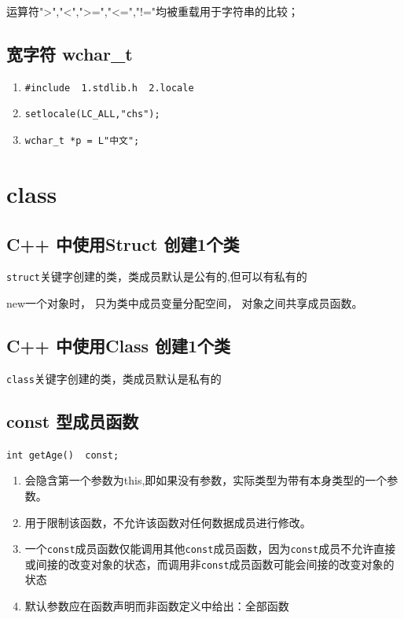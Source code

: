 \documentclass[UTF8,a4paper,12pt]{ctexbook} %
\begin{document}
	         运算符">","<",">=","<=","!="均被重载用于字符串的比较；
         
    \section{宽字符 wchar\_t}
	    \begin{enumerate}
	    	\item  \verb|#include  1.stdlib.h  2.locale|
	    	\item  \verb|setlocale(LC_ALL,"chs");|
	    	\item  \verb|wchar_t *p = L"中文";|
	    \end{enumerate}
       
\chapter{class}
       
\section{C++ 中使用Struct 创建1个类}\verb|struct|关键字创建的类，类成员默认是公有的,但可以有私有的
	
	 new一个对象时， 只为类中成员变量分配空间， 对象之间共享成员函数。
	       
\section{C++ 中使用Class 创建1个类}\verb|class|关键字创建的类，类成员默认是私有的
	       
\section{const 型成员函数}\verb|int getAge()  const;|
	       \begin{enumerate}[fullwidth,itemindent=2em,label=(\arabic*)]
		       \item  会隐含第一个参数为this,即如果没有参数，实际类型为带有本身类型的一个参数。
		       \item  用于限制该函数，不允许该函数对任何数据成员进行修改。
		       
		       \item  一个\verb|const|成员函数仅能调用其他\verb|const|成员函数，因为\verb|const|成员不允许直接或间接的改变对象的状态，而调用非\verb|const|成员函数可能会间接的改变对象的状态
		       
		       \item 默认参数应在函数声明而非函数定义中给出：全部函数
	       \end{enumerate}
\end{document}
